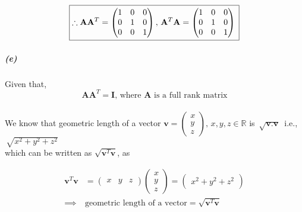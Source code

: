 \documentclass[12pt, letterpaper]{article}
\begin{document}
\[\boxed{
\therefore
\mathbf{A}\mathbf{A}^T =
\begin{pmatrix}
1 &0 &0\\
0 &1 &0\\
0 &0 &1
\end{pmatrix},\,
\mathbf{A}^T\mathbf{A} =
\begin{pmatrix}
1 &0 &0\\
0 &1 &0\\
0 &0 &1
\end{pmatrix}\\
}\]

\subparagraph{(e)} Given that,
\begin{equation}\label{5e}
\mathbf{AA}^T = \mathbf{I}\text{, where }\mathbf{A}\text{ is a full rank matrix}
\end{equation}\\

We know that geometric length of a vector $\mathbf{v} = \begin{pmatrix} x\\y\\z \end{pmatrix},\,x,y,z\in\mathbb{R}$ is
$\,\sqrt{\mathbf{v}.\mathbf{v}}\,$ i.e., $\,\sqrt{x^2 + y^2 + z^2}$\\
which can be written as $\sqrt{\mathbf{v}^T\mathbf{v}}$, as

\begin{equation}\label{5e1}\begin{split}
\mathbf{v}^T\mathbf{v} &= \begin{pmatrix}x&y&z\end{pmatrix}\begin{pmatrix}x\\y\\z\end{pmatrix}
    = \begin{pmatrix}x^2 + y^2 + z^2\end{pmatrix}\\
\implies &\boxed{\text{geometric length of a vector} = \sqrt{\mathbf{v}^T\mathbf{v}}}
\end{split}\end{equation}
\end{document}

